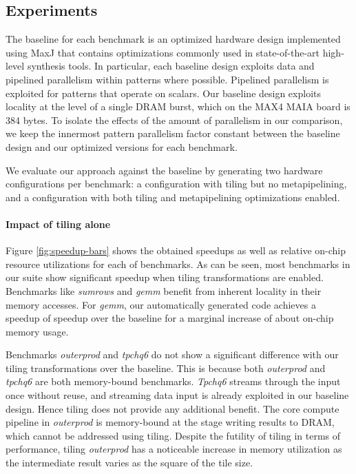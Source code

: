 \documentclass[pageno]{jpaper}
\begin{document}
\subsection{Experiments}
The baseline for each benchmark is an optimized hardware design implemented using MaxJ
that contains optimizations commonly used in state-of-the-art high-level synthesis
tools. In particular, each baseline design exploits data and pipelined parallelism within patterns where possible.
Pipelined parallelism is exploited for patterns that operate on scalars. Our baseline design
exploits locality at the level of a single DRAM burst, which on the MAX4 MAIA board is 384 bytes.
To isolate the effects of the amount of parallelism in our comparison, we keep
the innermost pattern parallelism factor constant between the baseline design and our optimized versions for each benchmark.

We evaluate our approach against the baseline by generating two hardware configurations per benchmark:
a configuration with tiling but no metapipelining, and a configuration with both tiling and metapipelining optimizations enabled.


\paragraph{Impact of tiling alone}
Figure \ref{fig:speedup-bars} shows the obtained speedups as well as relative on-chip resource utilizations for each of benchmarks.
As can be seen, most benchmarks in our suite show significant speedup when tiling
transformations are enabled. Benchmarks like \emph{sumrows} and \emph{gemm}
benefit from inherent locality in their memory accesses. For \emph{gemm}, our automatically generated code
achieves a speedup of  speedup over the baseline for a marginal increase of about  on-chip memory usage.



Benchmarks \emph{outerprod} and \emph{tpchq6} do not
show a significant difference with our tiling transformations over the baseline.
This is because both \emph{outerprod} and
\emph{tpchq6} are both memory-bound benchmarks. \emph{Tpchq6} streams through the input once without reuse, and streaming
data input is already exploited in our baseline design. Hence tiling does not provide any additional benefit.
The core compute pipeline in \emph{outerprod} is memory-bound at the stage writing results to DRAM, which cannot be addressed
using tiling. Despite the futility of tiling in terms of performance, tiling \emph{outerprod}
has a noticeable increase in memory utilization as the intermediate result varies as the square of the tile size.
\end{document}
